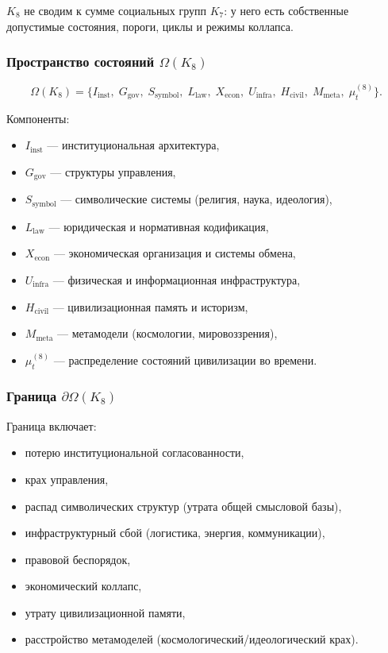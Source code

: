 $K_8$ не сводим к сумме социальных групп $K_7$: у него есть собственные
допустимые состояния, пороги, циклы и режимы коллапса.

\subsubsection{Пространство состояний \texorpdfstring{$\Omega(K_8)$}{$\Omega(K_8)$}}

\[
\Omega(K_8)=
\{
I_{\mathrm{inst}},\;
G_{\mathrm{gov}},\;
S_{\mathrm{symbol}},\;
L_{\mathrm{law}},\;
X_{\mathrm{econ}},\;
U_{\mathrm{infra}},\;
H_{\mathrm{civil}},\;
M_{\mathrm{meta}},\;
\mu^{(8)}_t
\}.
\]

Компоненты:
\begin{itemize}
    \item $I_{\mathrm{inst}}$ — институциональная архитектура,
    \item $G_{\mathrm{gov}}$ — структуры управления,
    \item $S_{\mathrm{symbol}}$ — символические системы (религия, наука, идеология),
    \item $L_{\mathrm{law}}$ — юридическая и нормативная кодификация,
    \item $X_{\mathrm{econ}}$ — экономическая организация и системы обмена,
    \item $U_{\mathrm{infra}}$ — физическая и информационная инфраструктура,
    \item $H_{\mathrm{civil}}$ — цивилизационная память и историзм,
    \item $M_{\mathrm{meta}}$ — метамодели (космологии, мировоззрения),
    \item $\mu^{(8)}_t$ — распределение состояний цивилизации во времени.
\end{itemize}

\subsubsection{Граница \texorpdfstring{$\partial\Omega(K_8)$}{$\partial\Omega(K_8)$}}

Граница включает:
\begin{itemize}
    \item потерю институциональной согласованности,
    \item крах управления,
    \item распад символических структур (утрата общей смысловой базы),
    \item инфраструктурный сбой (логистика, энергия, коммуникации),
    \item правовой беспорядок,
    \item экономический коллапс,
    \item утрату цивилизационной памяти,
    \item расстройство метамоделей (космологический/идеологический крах).
\end{itemize}

